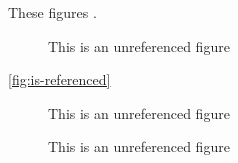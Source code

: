 \documentclass{article}
\begin{document}
These figures .
\begin{figure}
\caption{This is an unreferenced figure}\label{fig:ok-1}
\end{figure}

\ref{fig:is-referenced}


\begin{figure}
\caption{This is an unreferenced figure}\label{fig:ok-2}
\end{figure}


\begin{figure}
\caption{This is an unreferenced figure}\label{fig:ok-3}
\end{figure}
\end{document}
